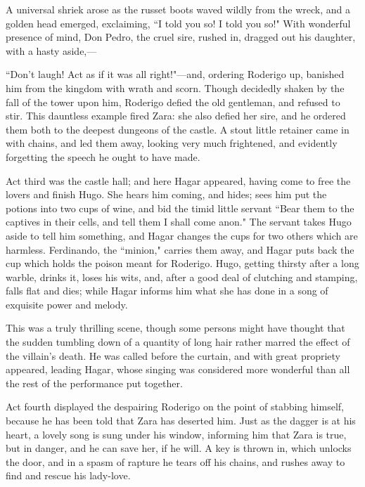 A universal shriek arose as the russet boots waved wildly from the
wreck, and a golden head emerged, exclaiming, ``I told you so! I told you
so!" With wonderful presence of mind, Don Pedro, the cruel sire, rushed
in, dragged out his daughter, with a hasty aside,---

``Don't laugh! Act as if it was all right!"---and,
ordering Roderigo up, banished him from the kingdom with wrath and
scorn. Though decidedly shaken by the fall of the tower upon him,
Roderigo defied the old gentleman, and refused to stir. This dauntless
example fired Zara: she also defied her sire, and he ordered them both
to the deepest dungeons of the castle. A stout little retainer came in
with chains, and led them away, looking very much frightened, and
evidently forgetting the speech he ought to have made.

Act third was the castle hall; and here Hagar appeared, having come to
free the lovers and finish Hugo. She hears him coming, and hides; sees
him put the potions into two cups of wine, and bid the timid little
servant ``Bear them to the captives in their cells, and tell them I shall
come anon." The servant takes Hugo aside to tell him something, and
Hagar changes the cups for two others which are harmless. Ferdinando,
the ``minion," carries them away, and Hagar puts back the cup which holds
the poison meant for Roderigo. Hugo, getting thirsty after a long
warble, drinks it, loses his wits, and, after a good deal of clutching
and stamping, falls flat and dies; while Hagar informs him what she has
done in a song of exquisite power and melody.

This was a truly thrilling scene, though some persons might have thought
that the sudden tumbling down of a quantity of long hair rather marred
the effect of the villain's death. He was called before
the curtain, and with great propriety appeared, leading Hagar, whose
singing was considered more wonderful than all the rest of the
performance put together.

Act fourth displayed the despairing Roderigo on the point of stabbing
himself, because he has been told that Zara has deserted him. Just as
the dagger is at his heart, a lovely song is sung under his window,
informing him that Zara is true, but in danger, and he can save her, if
he will. A key is thrown in, which unlocks the door, and in a spasm of
rapture he tears off his chains, and rushes away to find and rescue his
lady-love.

